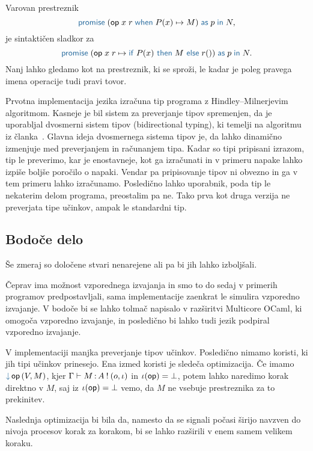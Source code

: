 
Varovan prestreznik $$\tmwithrecgu{op}{x}{r}{P(x)}{M}{p}{N},$$ je sintaktičen sladkor za $$\tmwithrec{op}{x}{r}{\tmif{P(x)}{M}{r()}}{p}{N}.$$
Nanj lahko gledamo kot na prestreznik, ki se sproži, le kadar je poleg pravega imena operacije tudi pravi tovor.

Prvotna implementacija jezika \aeff{} izračuna tip programa z Hindley–Milnerjevim algoritmom. 
Kasneje je bil sistem za preverjanje tipov spremenjen, da je uporabljal dvosmerni sistem tipov (bidirectional typing), ki temelji na algoritmu iz članka~\cite{bidirectional}.
Glavna ideja dvosmernega sistema tipov je, da lahko dinamično izmenjuje med preverjanjem in računanjem tipa. Kadar so tipi pripisani izrazom, tip le preverimo, kar je enostavneje, kot ga izračunati in v primeru napake lahko izpiše boljše poročilo o napaki. Vendar pa pripisovanje tipov ni obvezno in ga v tem primeru lahko izračunamo. Posledično lahko uporabnik, poda tip le nekaterim delom programa, preostalim pa ne.
Tako prva kot druga verzija ne preverjata tipe učinkov, ampak le standardni tip.

\subsection{Bodoče delo}

Še zmeraj so določene stvari nenarejene ali pa bi jih lahko izboljšali.

Čeprav ima \aeff{} možnost vzporednega izvajanja in smo to do sedaj v primerih programov predpostavljali, sama implementacije zaenkrat le simulira vzporedno izvajanje.
V bodoče bi se lahko tolmač napisalo v razširitvi Multicore OCaml, ki omogoča vzporedno izvajanje, in posledično bi lahko tudi jezik \aeff{} podpiral vzporedno izvajanje. 

V implementaciji manjka preverjanje tipov učinkov. Posledično nimamo koristi, ki jih tipi učinkov prinesejo. Ena izmed koristi je sledeča optimizacija. Če imamo $\tmopin{op}{V}{M}$, kjer $\Gamma \vdash M \mathinner{:} A \mathbin{!} (o, \iota)$ in $\iota(\mathsf{op}) = \bot$, potem lahko naredimo korak direktno v $M$, saj iz $\iota(\mathsf{op}) = \bot$ vemo, da $M$ ne vsebuje prestreznika za to prekinitev. 

Naslednja optimizacija bi bila da, namesto da se signali počasi širijo navzven do nivoja procesov korak za korakom, bi se lahko razširili v enem samem velikem koraku.

